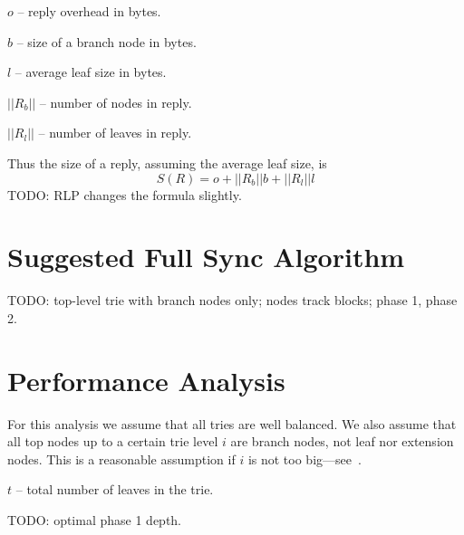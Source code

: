 \documentclass{amsart}
\begin{document}

$o$ -- reply overhead in bytes.

$b$ -- size of a branch node in bytes.

$l$ -- average leaf size in bytes.

$||R_b||$ -- number of nodes in reply.

$||R_l||$ -- number of leaves in reply.

Thus the size of a reply, assuming the average leaf size, is
\begin{equation}
    S(R) = o + ||R_b|| b + ||R_l|| l
\end{equation}
TODO: RLP changes the formula slightly.

\section{Suggested Full Sync Algorithm}
TODO: top-level trie with branch nodes only; nodes track blocks; phase 1, phase 2.

\section{Performance Analysis}
For this analysis we assume that all tries are well balanced.
We also assume that all top nodes up to a certain trie level $i$ are branch nodes, not leaf nor extension nodes.
This is a reasonable assumption if $i$ is not too big---see~\cite{akhunov_1x_workshop_part2}.

$t$ -- total number of leaves in the trie.

TODO: optimal phase 1 depth.
\end{document}
